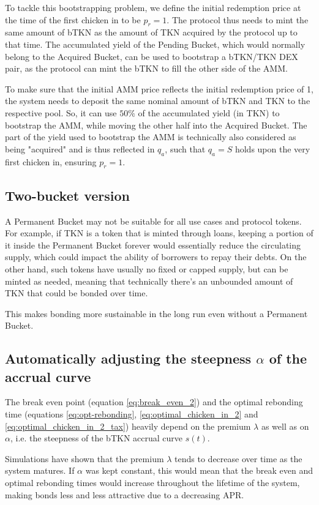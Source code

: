 \documentclass{article}
\begin{document}
To tackle this bootstrapping problem, we define the initial redemption price at the time of the first chicken in to be $p_r = 1$. The protocol thus needs to mint the same amount of bTKN as the amount of TKN acquired by the protocol up to that time. The accumulated yield of the Pending Bucket, which would normally belong to the Acquired Bucket, can be used to bootstrap a bTKN/TKN DEX pair, as the protocol can mint the bTKN to fill the other side of the AMM.

To make sure that the initial AMM price reflects the initial redemption price of 1, the system needs to deposit the same nominal amount of bTKN and TKN to the respective pool. So, it can use $50\%$ of the accumulated yield (in TKN) to bootstrap the AMM, while moving the other half into the Acquired Bucket. The part of the yield used to bootstrap the AMM is technically also considered as being "acquired" and is thus reflected in $q_a$, such that $q_a = S$ holds upon the very first chicken in, ensuring $p_r = 1$.

\subsection{Two-bucket version}
\label{sec:two-bucket}
A Permanent Bucket may not be suitable for all use cases and protocol tokens. For example, if TKN is a token that is minted through loans, keeping a portion of it inside the Permanent Bucket forever would essentially reduce the circulating supply, which could impact the ability of borrowers to repay their debts. On the other hand, such tokens have usually no fixed or capped supply, but can be minted as needed, meaning that technically there's an unbounded amount of TKN that could be bonded over time.

This makes bonding more sustainable in the long run even without a Permanent Bucket.


\subsection{Automatically adjusting the steepness $\alpha$ of the accrual curve}
  \label{sec:adjustment}
The break even point (equation \ref{eq:break_even_2}) and the optimal rebonding time (equations \ref{eq:opt-rebonding}, \ref{eq:optimal_chicken_in_2} and \ref{eq:optimal_chicken_in_2_tax}) heavily depend on the premium $\lambda$ as well as on $\alpha$, i.e. the steepness of the bTKN accrual curve $s(t)$. 

Simulations have shown that the premium $\lambda$ tends to decrease over time as the system matures. If  $\alpha$ was kept constant, this would mean that the break even and optimal rebonding times would increase throughout the lifetime of the system, making bonds less and less attractive due to a decreasing APR.
\end{document}
